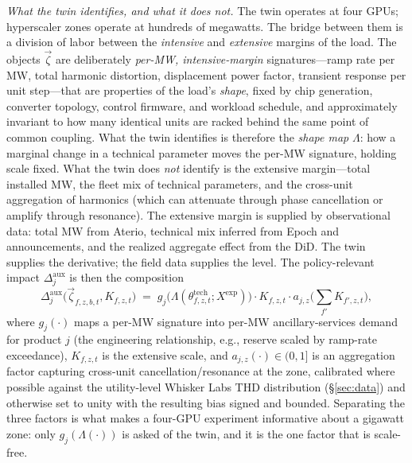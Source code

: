 \documentclass[12pt,letterpaper]{article}
\begin{document}
\emph{What the twin identifies, and what it does not.} The twin operates at
four GPUs; hyperscaler zones operate at hundreds of megawatts. The bridge
between them is a division of labor between the \emph{intensive} and
\emph{extensive} margins of the load. The objects $\vec\zeta$ are deliberately
\emph{per-MW, intensive-margin} signatures---ramp rate per MW, total harmonic
distortion, displacement power factor, transient response per unit step---that
are properties of the load's \emph{shape}, fixed by chip generation, converter
topology, control firmware, and workload schedule, and approximately invariant
to how many identical units are racked behind the same point of common
coupling. What the twin identifies is therefore the \emph{shape map}
$\Lambda$: how a marginal change in a technical parameter moves the per-MW
signature, holding scale fixed. What the twin does \emph{not} identify is the
extensive margin---total installed MW, the fleet mix of technical parameters,
and the cross-unit aggregation of harmonics (which can attenuate through
phase cancellation or amplify through resonance). The extensive margin is
supplied by observational data: total MW from Aterio, technical mix inferred
from Epoch and announcements, and the realized aggregate effect from the DiD.
The twin supplies the derivative; the field data supplies the level. The
policy-relevant impact $\Delta^{\text{aux}}_j$ is then the composition
\begin{equation}
\label{eq:aux_composition}
\Delta^{\text{aux}}_j\big(\vec\zeta_{f,z,b,t}, K_{f,z,t}\big)
\;=\; g_j\!\Big(\Lambda(\theta^{\text{tech}}_{f,z,t}; X^{\text{exp}})\Big)
\cdot K_{f,z,t} \cdot a_{j,z}\big(\textstyle\sum_{f'} K_{f',z,t}\big),
\end{equation}
where $g_j(\cdot)$ maps a per-MW signature into per-MW ancillary-services
demand for product $j$ (the engineering relationship, e.g., reserve scaled by
ramp-rate exceedance), $K_{f,z,t}$ is the extensive scale, and
$a_{j,z}(\cdot)\in(0,1]$ is an aggregation factor capturing cross-unit
cancellation/resonance at the zone, calibrated where possible against the
utility-level Whisker Labs THD distribution (\S\ref{sec:data}) and otherwise
set to unity with the resulting bias signed and bounded. Separating the three
factors is what makes a four-GPU experiment informative about a gigawatt zone:
only $g_j(\Lambda(\cdot))$ is asked of the twin, and it is the one factor that
is scale-free.
\end{document}
